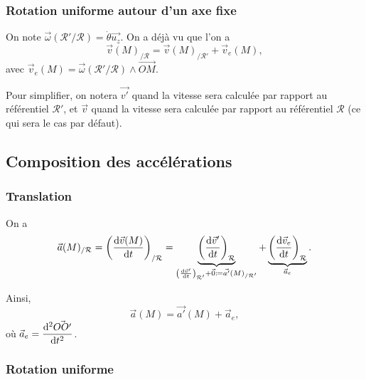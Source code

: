         \subsubsection{Rotation uniforme autour d'un axe fixe}

            On note $\vec{\omega}(\mathcal{R}'/\mathcal{R})=\dot{\theta}\vec{u_z}$. On a déjà vu que l'on a 
            \begin{equation*}
                \vec{v}(M)_{/\mathcal{R}}=\vec{v}(M)_{/\mathcal{R}'}+\vec{v}_e(M),
            \end{equation*}
            avec $\vec{v}_e(M)=\vec{\omega}(\mathcal{R}'/\mathcal{R})\wedge\vec{OM}$.

            Pour simplifier, on notera $\vec{v'}$ quand la vitesse sera calculée par rapport au référentiel $\mathcal{R}'$, et $\vec{v}$ quand la vitesse sera calculée par rapport au référentiel $\mathcal{R}$ (ce qui sera le cas par défaut).

    \subsection{Composition des accélérations}

        \subsubsection{Translation}

            On a
            \begin{equation*}
                \vec{a}(M)_{/\mathcal{R}}=\left(\dfrac{\mathrm{d}\vec{v}(M)}{\mathrm{d} t}\right)_{/\mathcal{R}}=
                \underbrace{\left(\frac{\mathrm{d}\vec{v}'}{\mathrm{d} t}\right)_{\mathcal{R}}}_{\left(\frac{\mathrm{d}\vec{v}'}{\mathrm{d} t}\right)_{\mathcal{R}'}+\vec{0}\coloneqq\vec{a'}(M)_{/\mathcal{R}'}}
                +\underbrace{\left(\frac{\mathrm{d}\vec{v}_e}{\mathrm{d} t}\right)_{\mathcal{R}}}_{\vec{a}_e}.
            \end{equation*}

            Ainsi,
            \begin{equation*}
                \boxed{
                    \vec{a}(M)=\vec{a'}(M)+\vec{a}_e,
                }
            \end{equation*}
            où $\vec{a}_e=\dfrac{\mathrm{d}^{2}\vec{OO'}}{\mathrm{d} t^{2}}$.

        \subsubsection{Rotation uniforme}

